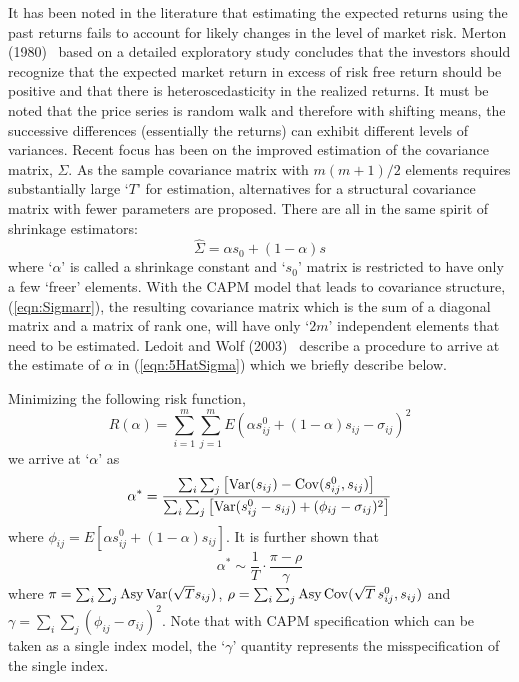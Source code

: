 It has been noted in the literature that estimating the expected returns using the past returns fails to account for likely changes in the level of market risk. Merton (1980)~\cite{merton} based on a detailed exploratory study concludes that the investors should recognize that the expected market return in excess of risk free return should be positive and that there is heteroscedasticity in the realized returns. It must be noted that the price series is random walk and therefore with shifting means, the successive differences (essentially the returns) can exhibit different levels of variances. Recent focus has been on the improved estimation of the covariance matrix, $\Sigma$. As the sample covariance matrix with $m(m+1)/2$ elements requires substantially large `$T$' for estimation, alternatives for a structural covariance matrix with fewer parameters are proposed. There are all in the same spirit of shrinkage estimators:
	\begin{equation}\label{eqn:5HatSigma}
	\hat{\Sigma}= \alpha s_0 + (1-\alpha)s
	\end{equation}
where `$\alpha$' is called a shrinkage constant and `$s_0$' matrix is restricted to have only a few `freer' elements. With the CAPM model that leads to covariance structure, (\ref{eqn:Sigmarr}), the resulting covariance matrix which is the sum of a diagonal matrix and a matrix of rank one, will have only `$2m$' independent elements that need to be estimated. Ledoit and Wolf (2003)~\cite{wolf} describe a procedure to arrive at the estimate of $\alpha$ in (\ref{eqn:5HatSigma}) which we briefly describe below. 


Minimizing the following risk function,
	\begin{equation}\label{eqn:ralpha}
	R(\alpha)= \sum_{i=1}^m \sum_{j=1}^m E(\alpha s_{ij}^0 + (1-\alpha) s_{ij} - \sigma_{ij})^2
	\end{equation}
we arrive at `$\alpha$' as
	\begin{equation}\label{eqn:bigalpha}
	\alpha^*= \dfrac{\sum_i \sum_{j} \left[ \Var(s_{ij}) - \Cov(s_{ij}^0, s_{ij}) \right]}{\sum_i \sum_j \left[ \Var(s_{ij}^0 - s_{ij}) + (\phi_{ij} - \sigma_{ij})^2 \right]}
	\end{equation}
where $\phi_{ij}=E[\alpha s_{ij}^0 + (1-\alpha)s_{ij}]$. It is further shown that
	\begin{equation}\label{eqn:alphastarsim}
	\alpha^* \sim \dfrac{1}{T} \cdot \dfrac{\pi - \rho}{\gamma}
	\end{equation}
where $\pi= \sum_i \sum_j \text{Asy}\operatorname{Var}(\sqrt{T}s_{ij})$, $\rho=\sum_i \sum_j \text{Asy}\operatorname{Cov}(\sqrt{T}\,s_{ij}^0, s_{ij})$ and $\gamma=\sum_i \sum_j (\phi_{ij} - \sigma_{ij})^2$. Note that with CAPM specification which can be taken as a single index model, the `$\gamma$' quantity represents the misspecification of the single index. 


